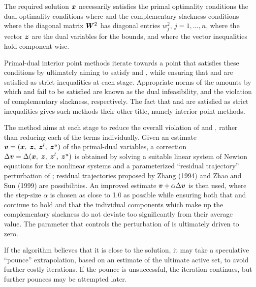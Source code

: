 \documentclass{galahad}
\begin{document}

\galmethod
The required solution ${\bm{x}}$ necessarily satisfies
the primal optimality conditions
the dual optimality conditions
where
and the complementary slackness conditions
where the diagonal matrix ${\bm{W}}^{2}$ has diagonal entries $w_{j}^{2}$,
$j = 1, \ldots , n$, where the vector ${\bm{z}}$ are
the dual variables for the bounds,
and where the vector inequalities hold component-wise.

Primal-dual interior point methods iterate towards a point
that satisfies these conditions by ultimately aiming to satisfy
 and , while ensuring that
 and  are
satisfied as strict inequalities at each stage.
Appropriate norms of the amounts by
which  and  fail to be satisfied are known as the
dual infeasibility, and the violation of complementary slackness,
respectively. The fact that  and  are satisfied as strict
inequalities gives such methods their other title, namely
interior-point methods.

The method aims at each stage to reduce the
overall violation of  and ,
rather than reducing each of the terms individually. Given an estimate
${\bm{v}} = ({\bm{x}}, \; {\bm{z}}, \; {\bm{z}}^{l}, \; {\bm{z}}^{u})$
of the primal-dual variables, a correction
$\Delta {\bm{v}} = \Delta ({\bm{x}}, \;{\bm{z}},\;{\bm{z}}^{l} ,\;{\bm{z}}^{u} )$
is obtained by solving a suitable linear system of Newton equations for the
nonlinear systems  and a parameterized ``residual
trajectory'' perturbation of ; residual trajectories
proposed by Zhang (1994) and Zhao and Sun (1999) are possibilities.
An improved estimate ${\bm{v}} + \alpha \Delta {\bm{v}}$
is then used, where the step-size $\alpha$
is chosen as close to 1.0 as possible while ensuring both that
 and  continue to hold and that the individual components
which make up the complementary slackness
 do not deviate too significantly
from their average value. The parameter that controls the perturbation
of  is ultimately driven to zero.

If the algorithm believes that it is close to the solution, it may take a
speculative ``pounce'' extrapolation, based on an estimate of the ultimate 
active set, to avoid further costly iterations. If the pounce is unsuccessful, 
the iteration continues, but further pounces may be attempted later.
\end{document}
